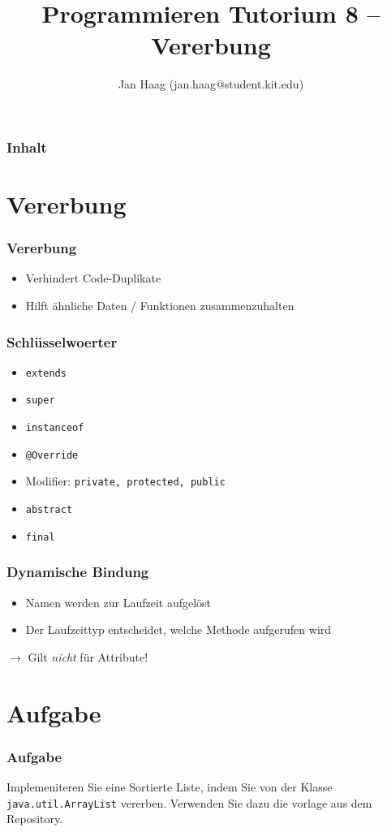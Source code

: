 \documentclass{beamer}
\author{Jan Haag (jan.haag@student.kit.edu)}
\title{Programmieren Tutorium 8 -- Vererbung}
\institute{Institut f\"{u}r Zeritfizierbare und Vertrauensw\"{u}rdige Informatiksysteme (ZVI)}
\begin{document}
\begin{frame}
\maketitle
\end{frame}

\begin{frame}
\frametitle{Inhalt}
\tableofcontents
\end{frame}

\section{Vererbung}
\begin{frame}
\frametitle{Vererbung}
\begin{itemize}
\item Verhindert Code-Duplikate
\item Hilft \"{a}hnliche Daten / Funktionen zusammenzuhalten
\end{itemize}
\end{frame}

\begin{frame}[fragile]
\frametitle{Schl\"{u}sselwoerter}
\begin{itemize}
\item \verb|extends|
\item \verb|super|
\item \verb|instanceof|
\item \verb|@Override|
\item Modifier: \verb|private, protected, public|
\item \verb|abstract|
\item \verb|final|
\end{itemize}
\end{frame}

\begin{frame}
\frametitle{Dynamische Bindung}
\begin{itemize}
\item Namen werden zur Laufzeit aufgel\"{o}st
\item Der Laufzeittyp entscheidet, welche Methode aufgerufen wird
\end{itemize}
$\rightarrow{}$ Gilt \emph{nicht} f\"{u}r Attribute!
\end{frame}

\section{Aufgabe}
\begin{frame}[fragile]
\frametitle{Aufgabe}
Implemeniteren Sie eine Sortierte Liste, indem Sie von der Klasse
\verb|java.util.ArrayList| vererben. Verwenden Sie dazu die vorlage aus dem
Repository.
\end{frame}
\end{document}
